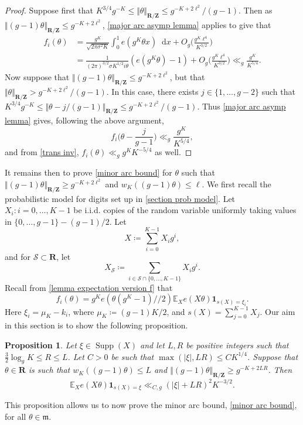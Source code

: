 \documentclass[hidelinks,11pt,reqno]{amsart}
\renewcommand{\leq}{\leqslant}
\renewcommand{\geq}{\geqslant}
\newcommand{\Z}{\ensuremath{\mathbf{Z}}}
\newcommand{\R}{\ensuremath{\mathbf{R}}}
\newcommand{\E}{\ensuremath{\mathbb{E}}}
\newcommand\Supp{\operatorname{Supp}}
\newcommand{\st}{\ensuremath{:}}
\newcommand{\ind}{\mathbf{1}}
\newcommand*\dif{\mathop{}\!\mathrm{d}}
\newcommand{\xb}{X}
\newcommand{\Vertr}{\Vert_{\R/\Z}}
\newcommand{\sx}[1]{s(#1)}
\newcommand{\V}[1]{\Vert #1 \Vertr}
\newtheorem{prop}{Proposition}[section]
\theoremstyle{remark}
\begin{document}
\begin{proof}
Suppose first that $K^{3/4}g^{-K}\leq \V{\theta}\leq g^{-K+2\ell^{2}}/(g-1)$. Then as $\V{(g-1)\theta}\leq g^{-K+2\ell^{2}}$, \cref{major arc asymp lemma} applies to give that
\begin{align*}
    f_{i}(\theta)&=\frac{g^{K}}{\sqrt{2\pi\sigma^{2}K}}\int_{0}^{1}e(g^{K}\theta x)\dif x+O_{g}\Big (\frac{g^{K}\ell^{4}}{K^{3/2}}\Big)\\
    &=\frac{1}{(2\pi)^{3/2}\sigma K^{1/2}i\theta}(e(g^{K}\theta)-1)+O_{g}\Big (\frac{g^{K}\ell^{4}}{K^{3/2}}\Big)\ll_{g} \frac{g^{K}}{K^{5/4}}.
\end{align*}
Now suppose that $\V{(g-1)\theta}\leq g^{-K+2\ell^{2}}$, but that $\V{\theta}>g^{-K+2\ell^{2}}/(g-1)$. In this case, there exists $j\in \{1,\ldots, g-2\}$ such that $K^{3/4}g^{-K} \leq \V{\theta-j/(g-1)}\leq g^{-K+2\ell^{2}}/(g-1)$. Thus \cref{major arc asymp lemma} gives, following the above argument,
\[f_{i}\Big (\theta-\frac{j}{g-1}\Big)\ll_{g} \frac{g^{K}}{K^{5/4}},\]
and from \cref{trans inv}, $f_{i}(\theta)\ll_{g} g^{K}K^{-5/4}$ as well.
\end{proof}
It remains then to prove \cref{minor arc bound} for $\theta$ such that $\V{(g-1)\theta}\geq g^{-K+2\ell^{2}}$ and $w_{K}((g-1)\theta)\leq \ell$. We first recall the probabilistic model for digits set up in \cref{section prob model}. Let $X_{i} \st i=0,\ldots, K-1$ be i.i.d. copies of the random variable uniformly taking values in $\{0,\ldots, g-1\}-(g-1)/2$. Let 
\[\xb\coloneq \sum_{i=0}^{K-1}X_{i}g^{i},\]
and for $\mathcal{S}\subset \R$, let
\[\xb_{\mathcal{S}}\coloneq\sum_{i\in \mathcal{S}\cap \{0,\ldots, K-1\}}X_{i}g^{i}.\]
Recall from \cref{lemma expectation version f} that 
\[f_{i}(\theta)=g^{K}e(\theta(g^{K}-1)//2)\E_{\xb}e(\xb\theta)\ind_{\sx{\xb}=\xi_{i}}.\]
Here $\xi_{i}=\mu_{K}-k_{i}$, where $\mu_{K}\coloneq (g-1)K/2$, and $\sx{\xb}=\sum_{j=0}^{K-1}X_{j}$. Our aim in this section is to show the following proposition.
\begin{prop}\label{minor arc few non zero} Let $\xi\in \Supp(X)$ and
let $L,R$ be positive integers such that $\tfrac{3}{2} \log_{g} K\leq R\leq L$. Let $C>0$ be such that $\max(|\xi|,LR)\leq CK^{1/4}$. Suppose that $\theta\in\R$ is such that $w_{K}((g-1)\theta) \leq L$ and $\V{(g-1)\theta}\geq g^{-K+2LR}$. Then
 \[\E_{\xb}e(\xb\theta)\ind_{\sx{\xb}=\xi}\ll_{C,g} (|\xi|+LR)^{2}K^{-3/2}.\]
\end{prop}
This proposition allows us to now prove the minor arc bound, \cref{minor arc bound}, for all $\theta \in \mathfrak{m}$.
\end{document}
